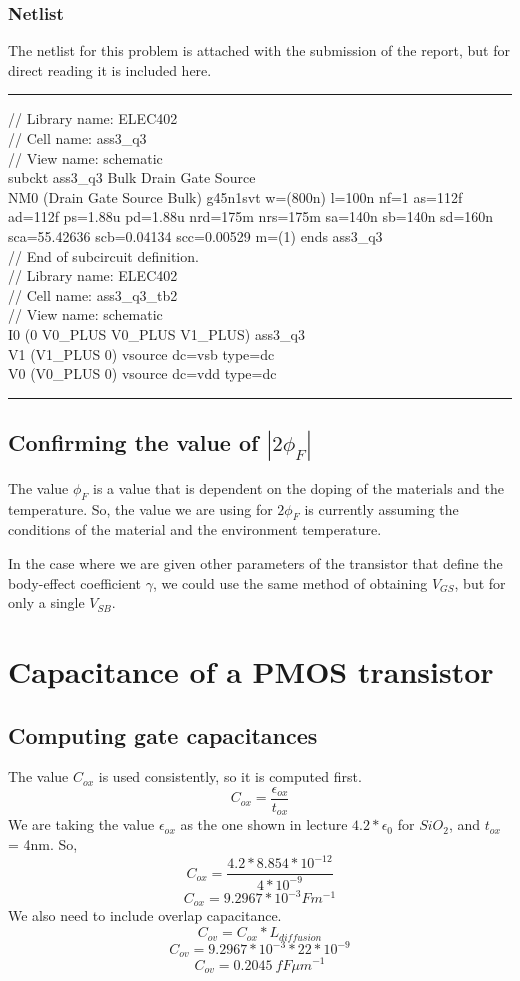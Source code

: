 \documentclass[12pt]{article}
\begin{document}
\subsubsection{Netlist}
The netlist for this problem is attached with the submission of the report, but for direct reading it is included here.

\rule{\textwidth}{1pt}
// Library name: ELEC402\\
// Cell name: ass3\_q3\\
// View name: schematic\\
subckt ass3\_q3 Bulk Drain Gate Source\\
    NM0 (Drain Gate Source Bulk) g45n1svt w=(800n) l=100n nf=1 as=112f \\
        ad=112f ps=1.88u pd=1.88u nrd=175m nrs=175m sa=140n sb=140n
        sd=160n sca=55.42636 scb=0.04134 scc=0.00529 m=(1)
ends ass3\_q3\\
// End of subcircuit definition.\\

// Library name: ELEC402\\
// Cell name: ass3\_q3\_tb2\\
// View name: schematic\\
I0 (0 V0\_PLUS V0\_PLUS V1\_PLUS) ass3\_q3\\
V1 (V1\_PLUS 0) vsource dc=vsb type=dc\\
V0 (V0\_PLUS 0) vsource dc=vdd type=dc\\
\rule{\textwidth}{0.5pt}
\subsection{Confirming the value of $|2\phi_F|$}
The value $\phi_F$ is a value that is dependent on the doping of the materials and the temperature. So, the value we are using for $2\phi_F$
is currently assuming the conditions of the material and the environment temperature. 

In the case where we are given other parameters of the transistor that define the body-effect coefficient $\gamma$, we could use the 
same method of obtaining $V_{GS}$, but for only a single $V_{SB}$.

\pagebreak

\section{Capacitance of a PMOS transistor}
\subsection{Computing gate capacitances}
The value $C_{ox}$ is used consistently, so it is computed first.
\[C_{ox} = \frac{\epsilon _{ox}}{t_{ox}} \]
We are taking the value $\epsilon _{ox}$ as the one shown in lecture $4.2*\epsilon _0$ for $SiO_2$, and $t_{ox}$ = 4nm. So,
\[C_{ox} = \frac{4.2*8.854*10^{-12}}{4*10^{-9}} \]
\[C_{ox} = 9.2967*10^{-3} Fm^{-1}\]
We also need to include overlap capacitance.
\[C_{ov} = C_{ox} * L_{diffusion} \]
\[C_{ov} = 9.2967*10^{-3} * 22 * 10^{-9} \]
\[C_{ov} = \SI{0.2045}{fF \mu m^{-1}}\]
\end{document}
